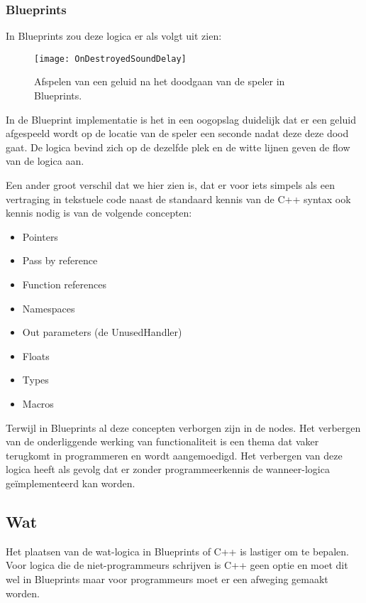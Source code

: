 \subsubsection{Blueprints}
In Blueprints zou deze logica er als volgt uit zien:

\begin{figure}[!ht]
  \centering
    \texttt{[image: OnDestroyedSoundDelay]}
    \caption{Afspelen van een geluid na het doodgaan van de speler in Blueprints.}
\end{figure}

In de Blueprint implementatie is het in een oogopslag duidelijk dat er een geluid afgespeeld wordt op de locatie van de speler een seconde nadat deze deze dood gaat. De logica bevind zich op de dezelfde plek en de witte lijnen geven de flow van de logica aan. 

Een ander groot verschil dat we hier zien is, dat er voor iets simpels als een vertraging in tekstuele code naast de standaard kennis van de C++ syntax ook kennis nodig is van de volgende concepten:

\begin{itemize}
	\item Pointers
	\item Pass by reference
	\item Function references
	\item Namespaces
	\item Out parameters (de UnusedHandler)
	\item Floats
	\item Types
	\item Macros 
\end{itemize}

Terwijl in Blueprints al deze concepten verborgen zijn in de nodes. Het verbergen van de onderliggende werking van functionaliteit is een thema dat vaker terugkomt in programmeren en wordt aangemoedigd. Het verbergen van deze logica heeft als gevolg dat er zonder programmeerkennis de wanneer-logica geïmplementeerd kan worden.

\subsection{Wat}

Het plaatsen van de wat-logica in Blueprints of C++ is lastiger om te bepalen. Voor logica die de niet-programmeurs schrijven is C++ geen optie en moet dit wel in Blueprints maar voor programmeurs moet er een afweging gemaakt worden.

